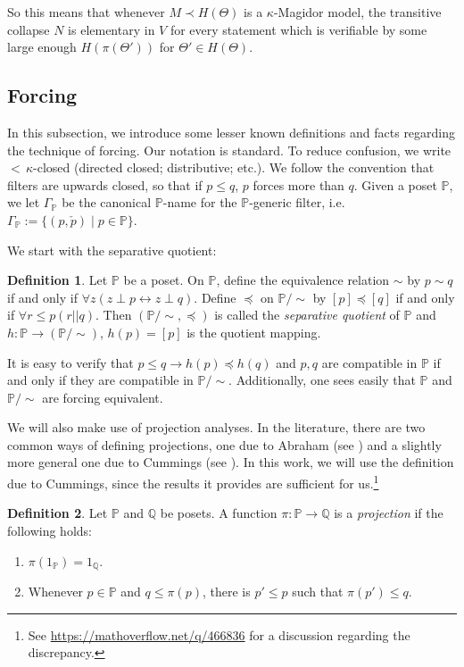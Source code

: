 \documentclass[a4paper]{amsart}
\theoremstyle{definition}
\newtheorem{mydef}{Definition}[section]
\theoremstyle{remark}
\theoremstyle{plain}
\numberwithin{mydef}{section}
\newcommand{\dP}{\mathbb{P}}
\newcommand{\dQ}{\mathbb{Q}}
\begin{document}
	So this means that whenever $M\prec H(\Theta)$ is a $\kappa$-Magidor model, the transitive collapse $N$ is elementary in $V$ for every statement which is verifiable by some large enough $H(\pi(\Theta'))$ for $\Theta'\in H(\Theta)$.
	
	\subsection{Forcing}\hfill
	
	In this subsection, we introduce some lesser known definitions and facts regarding the technique of forcing. Our notation is standard. To reduce confusion, we write ${<}\,\kappa$-closed (directed closed; distributive; etc.). We follow the convention that filters are upwards closed, so that if $p\leq q$, $p$ forces more than $q$. Given a poset $\dP$, we let $\Gamma_{\dP}$ be the canonical $\dP$-name for the $\dP$-generic filter, i.e. $\Gamma_{\dP}:=\{(p,\check{p})\;|\;p\in\dP\}$.
	
	We start with the separative quotient:
	
	\begin{mydef}
		Let $\dP$ be a poset. On $\dP$, define the equivalence relation $\sim$ by $p\sim q$ if and only if $\forall z(z\perp p\leftrightarrow z\perp q)$. Define $\preceq$ on $\dP/\sim$ by $[p]\preceq[q]$ if and only if $\forall r\leq p(r||q)$. Then $(\dP/\sim,\preceq)$ is called the \emph{separative quotient} of $\dP$ and $h\colon\dP\to(\dP/\sim)$, $h(p)=[p]$ is the quotient mapping.
	\end{mydef}
	
	It is easy to verify that $p\leq q\to h(p)\preceq h(q)$ and $p,q$ are compatible in $\dP$ if and only if they are compatible in $\dP/\sim$. Additionally, one sees easily that $\dP$ and $\dP/\sim$ are forcing equivalent.
	
	We will also make use of projection analyses. In the literature, there are two common ways of defining projections, one due to Abraham (see \cite[Page 335]{AbrahamHandbook}) and a slightly more general one due to Cummings (see \cite[Definition 5.2]{CummingsHandbook}). In this work, we will use the definition due to Cummings, since the results it provides are sufficient for us.\footnote{See \url{https://mathoverflow.net/q/466836} for a discussion regarding the discrepancy.}
	
	\begin{mydef}
		Let $\dP$ and $\dQ$ be posets. A function $\pi\colon\dP\to\dQ$ is a \emph{projection} if the following holds:
		\begin{enumerate}
			\item $\pi(1_{\dP})=1_{\dQ}$.
			\item Whenever $p\in\dP$ and $q\leq\pi(p)$, there is $p'\leq p$ such that $\pi(p')\leq q$.
		\end{enumerate}
	\end{mydef}
	
\end{document}
